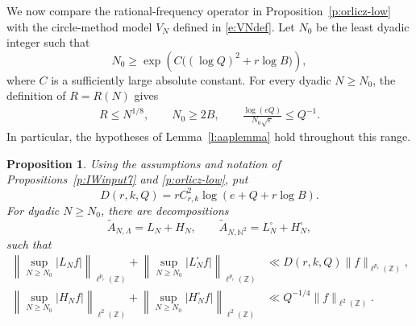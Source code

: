 \documentclass[12pt,reqno]{amsart}
\numberwithin{equation}{section}
\newtheorem{proposition}[equation]{Proposition}
\theoremstyle{definition}
\theoremstyle{remark}
\begin{document}
We now compare the rational-frequency operator in
Proposition~\ref{p:orlicz-low} with the circle-method model
\(V_N\) defined in \eqref{e:VNdef}.  Let \(N_0\) be the least dyadic
integer such that
\begin{equation}\label{e:orlicz-N0}
 N_0\geq
 \exp\left(C\bigl((\log Q)^2+r\log B\bigr)\right),
\end{equation}
where \(C\) is a sufficiently large absolute constant.  For every
dyadic \(N\geq N_0\), the definition of \(R=R(N)\) gives
\begin{align}\label{e:orlicz-parameter-range}
 R\leq N^{1/8},\qquad
 N_0\geq2B,\qquad
 \frac{\log(eQ)}{N_0\sqrt\varepsilon}\leq Q^{-1}.
\end{align}
In particular, the hypotheses of Lemma~\ref{l:aaplemma} hold throughout
this range.

\begin{proposition}\label{p:orlicz-hilo}
Using the assumptions and notation of
Propositions~\ref{p:IWinput7} and \ref{p:orlicz-low}, put
\begin{equation}\label{e:orlicz-D}
 D(r,k,Q)=rC_{r,k}^2\log(e+Q+r\log B).
\end{equation}
For dyadic \(N\geq N_0\), there are decompositions
\[
 \widetilde A_{N,\Lambda}=L_N+H_N,
 \qquad
 \widetilde A_{N,\mathbb N^2}=L_N^\square+H_N^\square,
\]
such that
\begin{align}
 \left\|\sup_{N\geq N_0}|L_Nf|\right\|_{\ell^{p_r}(\mathbb Z)}
 +
 \left\|\sup_{N\geq N_0}|L_N^\square f|\right\|_{\ell^{p_r}(\mathbb Z)}
 &\ll D(r,k,Q)\|f\|_{\ell^{p_r}(\mathbb Z)},
 \label{e:orlicz-low-comparison}\\
 \left\|\sup_{N\geq N_0}|H_Nf|\right\|_{\ell^2(\mathbb Z)}
 +
 \left\|\sup_{N\geq N_0}|H_N^\square f|\right\|_{\ell^2(\mathbb Z)}
 &\ll Q^{-1/4}\|f\|_{\ell^2(\mathbb Z)}.
 \label{e:orlicz-high-comparison}
\end{align}
\end{proposition}
\end{document}
